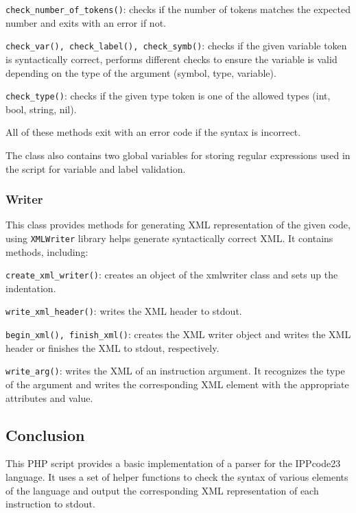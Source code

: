 \documentclass[11pt,a4paper]{article}
\begin{document}
    \verb|check_number_of_tokens()|: checks if the number of tokens matches the expected number and exits with an error if not.

    \verb|check_var(), check_label(), check_symb()|: checks if the given variable token is syntactically correct, performs different checks to ensure the variable is valid depending on the type of the argument (symbol, type, variable).

    \verb|check_type()|: checks if the given type token is one of the allowed types (int, bool, string, nil).

    All of these methods exit with an error code if the syntax is incorrect.

The class also contains two global variables for storing regular expressions used in the script for variable and label validation.

\subsubsection*{Writer}

This class provides methods for generating XML representation of the given code, using \verb|XMLWriter| library helps generate syntactically correct XML. It contains methods, including:

    \verb|create_xml_writer()|: creates an object of the xmlwriter class and sets up the indentation.

    \verb|write_xml_header()|: writes the XML header to stdout.

    \verb|begin_xml(), finish_xml()|: creates the XML writer object and writes the XML header or finishes the XML to stdout, respectively.

    \verb|write_arg()|: writes the XML of an instruction argument. It recognizes the type of the argument and writes the corresponding XML element with the appropriate attributes and value.

\subsection*{Conclusion}

This PHP script provides a basic implementation of a parser for the IPPcode23 language. It uses a set of helper functions to check the syntax of various elements of the language and output the corresponding XML representation of each instruction to stdout.
\end{document}
